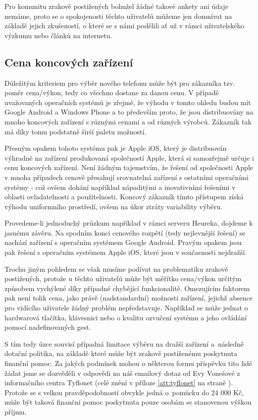 \documentclass[thesis=M,czech]{FITthesis}[2012/06/26]
\begin{document}
Pro komunitu zrakově postižených bohužel žádné takové ankety ani údaje nemáme, proto se o spokojenosti těchto uživatelů můžeme jen domnívat na základě jejich zkušeností, o které se s námi podělili ať už v rámci uživatelského výzkumu nebo článků na internetu.

\subsection{Cena koncových zařízení}
Důležitým kriteriem pro výběr nového telefonu může být pro zákazníka tzv. poměr cena/výkon, tedy co všechno dostane za danou cenu. V případě uvažovaných operačních systémů je zřejmé, že výhodu v tomto ohledu budou mít Google Android a Windows Phone a to především proto, že jsou distribuovány na mnoho koncových zařízení s různými cenami a od různých výrobců. Zákazník tak má díky tomu podstatně širší paletu možností.

Přesným opakem tohoto systému pak je Apple iOS, který je distribuován výhradně na zařízení produkovaná společností Apple, která si samozřejmě určuje i cenu koncových zařízení. Není žádným tajemstvím, že řešení od společnosti Apple v mnoha případech cenově přesahují srovnatelná zařízení s ostatními operačními systémy - což ovšem dohání například nápaditými a inovativními řešeními v oblasti ovladatelnosti a použitelnosti. Koncový zákazník tímto přístupem získá výhodu uniformního prostředí, ovšem na úkor ztráty variability výběru.

Provedeme-li jednoduchý průzkum například v rámci serveru Heureka\cite{heureka}, dojdeme k jasnému závěru. Na spodním konci cenového rozpětí (tedy nejlevnější řešení) se nachází zařízení s operačním systémem Google Android. Pravým opakem jsou pak řešení s operačním systémem Apple iOS, které jsou v současnosti nejdražší.

Trochu jiným pohledem se však musíme podívat na problematiku zrakově postižených, protože u těchto uživatelů může být měřítko cena/výkon určitým způsobem vychýlené díky případné chybějící funkcionalitě. Omezujícím faktorem pak není tolik cena, jako právě (nadstandardní) možnosti zařízení, jejichž absence pro vidícího uživatele žádný problém nepředstavuje. Například se může jednat o hardwarová tlačítka, klávesnici nebo o kvalitu ozvučení systému a jeho ovládání pomocí nadefinovaných gest.

S tím tedy úzce souvisí případná limitace výběru na dražší zařízení a~následně dotační politika, na základě které může být zrakově postiženému poskytnuta finanční pomoc. Za jakých podmínek mohou o některou formu příspěvku tito lidé žádat jsme se dozvěděli v odpovědi na náš emailový dotaz od Evy Vonešové z informačního centra Tyflonet (celé znění v příloze \ref{att:tyflonet} na straně \pageref{att:tyflonet}). Protože se s velkou pravděpodobností obvykle jedná o~pomůcku do 24 000 Kč, může být taková finanční pomoc poskytnuta pouze osobám se stanovenou výškou příjmu.
\end{document}
